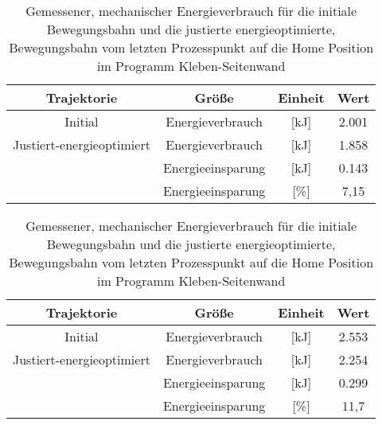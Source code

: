 \begin{table}[tbph]
	\centering
	\caption{Simulierter, mechanischer Energieverbrauch für die initiale Bewegungsbahn und die justierte energieoptimierte, Bewegungsbahn vom letzten Prozesspunkt auf die  Home Position im Programm Kleben-Seitenwand}
	\label{tab:energieverbrauch-simuliert}
	\begin{tabular}{|c|c|c|c|}
		\hline
		Trajektorie & Größe & Einheit & Wert \\
		\hline
		Initial & Energieverbrauch & [kJ] &2.001  \\
		\hline
		Justiert-energieoptimiert & Energieverbrauch & [kJ] &1.858  \\
		\hline
		& Energieeinsparung & [kJ] &0.143  \\
		\hline
		& Energieeinsparung & [\%] &7,15  \\
		\hline
	\end{tabular}
	\centering
	\caption{Gemessener, mechanischer Energieverbrauch für die initiale Bewegungsbahn und die justierte energieoptimierte, Bewegungsbahn vom letzten Prozesspunkt auf die  Home Position im Programm Kleben-Seitenwand}
	\label{tab:energieverbrauch-gemessen}
	\begin{tabular}{|c|c|c|c|}
		\hline
		Trajektorie & Größe & Einheit & Wert \\
		\hline
		Initial & Energieverbrauch & [kJ] &2.553  \\
		\hline
		Justiert-energieoptimiert & Energieverbrauch & [kJ] &2.254 \\
		\hline
		& Energieeinsparung & [kJ] &0.299  \\
		\hline
		& Energieeinsparung & [\%] &11,7 \\
		\hline
	\end{tabular}
\end{table}


